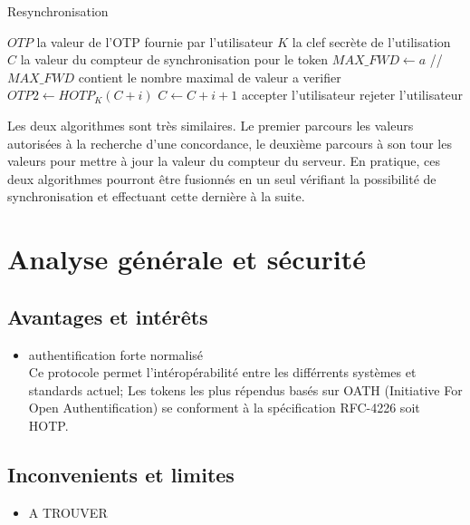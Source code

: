 \documentclass{../res/univ-projet}
\begin{document}
  \begin{algorithm}
    \caption{Resynchronisation}
    \label{HOTP:synch}
    
    \begin{algorithmic}
      \REQUIRE $OTP$ la valeur de l'OTP fournie par l'utilisateur
      \REQUIRE $K$ la clef secrète de l'utilisation
      \REQUIRE $C$ la valeur du compteur de synchronisation pour le token
      \STATE $MAX\_FWD \leftarrow a$ //$MAX\_FWD$ contient le nombre maximal de valeur a verifier
	\STATE $OTP2 \leftarrow HOTP_K(C + i)$
	  \STATE $C \leftarrow C + i + 1$
	  \STATE accepter l'utilisateur
	\ENDIF
      \ENDFOR
      \STATE rejeter l'utilisateur
    \end{algorithmic}
  \end{algorithm}
  
  Les deux algorithmes sont très similaires. Le premier parcours les valeurs autorisées à la recherche d'une concordance, le deuxième parcours à son tour les valeurs pour 
  mettre à jour la valeur du compteur du serveur. En pratique, ces deux algorithmes pourront \^etre fusionnés en un seul vérifiant la possibilité de synchronisation et 
  effectuant cette dernière à la suite.
  
\section{Analyse générale et sécurité}

  \subsection{Avantages et intér\^ets}
  \begin{itemize}
  \item authentification forte normalisé \\
  Ce protocole permet l'int\'{e}rop\'{e}rabilit\'{e} entre les diff\'{e}rrents systèmes et standards actuel; Les tokens les plus r\'{e}pendus bas\'{e}s sur OATH (Initiative For Open Authentification) se conforment à la sp\'{e}cification RFC-4226 soit HOTP.
  \end{itemize}
  \subsection{Inconvenients et limites}
  \begin{itemize}
  \item A TROUVER \\
  \end{itemize}
\end{document}
